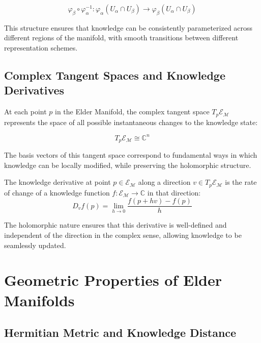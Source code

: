 \begin{equation}
\varphi_{\beta} \circ \varphi_{\alpha}^{-1}: \varphi_{\alpha}(U_{\alpha} \cap U_{\beta}) \rightarrow \varphi_{\beta}(U_{\alpha} \cap U_{\beta})
\end{equation}

This structure ensures that knowledge can be consistently parameterized across different regions of the manifold, with smooth transitions between different representation schemes.

\subsection{Complex Tangent Spaces and Knowledge Derivatives}

At each point $p$ in the Elder Manifold, the complex tangent space $T_p\mathcal{E}_{\mathcal{M}}$ represents the space of all possible instantaneous changes to the knowledge state:

\begin{equation}
T_p\mathcal{E}_{\mathcal{M}} \cong \mathbb{C}^n
\end{equation}

The basis vectors of this tangent space correspond to fundamental ways in which knowledge can be locally modified, while preserving the holomorphic structure.

\begin{definition}
The knowledge derivative at point $p \in \mathcal{E}_{\mathcal{M}}$ along a direction $v \in T_p\mathcal{E}_{\mathcal{M}}$ is the rate of change of a knowledge function $f: \mathcal{E}_{\mathcal{M}} \rightarrow \mathbb{C}$ in that direction:
\begin{equation}
D_v f(p) = \lim_{h \rightarrow 0} \frac{f(p + hv) - f(p)}{h}
\end{equation}
\end{definition}

The holomorphic nature ensures that this derivative is well-defined and independent of the direction in the complex sense, allowing knowledge to be seamlessly updated.

\section{Geometric Properties of Elder Manifolds}

\subsection{Hermitian Metric and Knowledge Distance}

